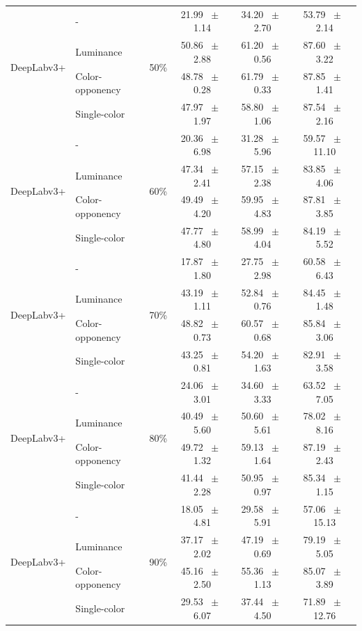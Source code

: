 \begin{table}[h]
\begin{tabular}{@{}l l c c c c@{}}
    \multirow{4}{*}{DeepLabv3+} & - & \multirow{4}{*}{50\%} & 21.99 ~$\pm$~ 1.14 & 34.20 ~$\pm$~ 2.70 & 53.79 ~$\pm$~ 2.14 \\
    & Luminance &  & 50.86 ~$\pm$~ 2.88 & 61.20 ~$\pm$~ 0.56 & 87.60 ~$\pm$~ 3.22 \\
    & Color-opponency &  & 48.78 ~$\pm$~ 0.28 & 61.79 ~$\pm$~ 0.33 & 87.85 ~$\pm$~ 1.41 \\
    & Single-color &  & 47.97 ~$\pm$~ 1.97 & 58.80 ~$\pm$~ 1.06 & 87.54 ~$\pm$~ 2.16 \\
    \midrule
    \multirow{4}{*}{DeepLabv3+} & - & \multirow{4}{*}{60\%} & 20.36 ~$\pm$~ 6.98 & 31.28 ~$\pm$~ 5.96 & 59.57 ~$\pm$~ 11.10 \\
    & Luminance &  & 47.34 ~$\pm$~ 2.41 & 57.15 ~$\pm$~ 2.38 & 83.85 ~$\pm$~ 4.06 \\
    & Color-opponency &  & 49.49 ~$\pm$~ 4.20 & 59.95 ~$\pm$~ 4.83 & 87.81 ~$\pm$~ 3.85 \\
    & Single-color &  & 47.77 ~$\pm$~ 4.80 & 58.99 ~$\pm$~ 4.04 & 84.19 ~$\pm$~ 5.52 \\
    \midrule
    \multirow{4}{*}{DeepLabv3+} & - & \multirow{4}{*}{70\%} & 17.87 ~$\pm$~ 1.80 & 27.75 ~$\pm$~ 2.98 & 60.58 ~$\pm$~ 6.43 \\
    & Luminance &  & 43.19 ~$\pm$~ 1.11 & 52.84 ~$\pm$~ 0.76 & 84.45 ~$\pm$~ 1.48 \\
    & Color-opponency &  & 48.82 ~$\pm$~ 0.73 & 60.57 ~$\pm$~ 0.68 & 85.84 ~$\pm$~ 3.06 \\
    & Single-color &  & 43.25 ~$\pm$~ 0.81 & 54.20 ~$\pm$~ 1.63 & 82.91 ~$\pm$~ 3.58 \\
    \midrule
    \multirow{4}{*}{DeepLabv3+} & - & \multirow{4}{*}{80\%} & 24.06 ~$\pm$~ 3.01 & 34.60 ~$\pm$~ 3.33 & 63.52 ~$\pm$~ 7.05 \\
    & Luminance &  & 40.49 ~$\pm$~ 5.60 & 50.60 ~$\pm$~ 5.61 & 78.02 ~$\pm$~ 8.16 \\
    & Color-opponency &  & 49.72 ~$\pm$~ 1.32 & 59.13 ~$\pm$~ 1.64 & 87.19 ~$\pm$~ 2.43 \\
    & Single-color &  & 41.44 ~$\pm$~ 2.28 & 50.95 ~$\pm$~ 0.97 & 85.34 ~$\pm$~ 1.15 \\
    \midrule
    \multirow{4}{*}{DeepLabv3+} & - & \multirow{4}{*}{90\%} & 18.05 ~$\pm$~ 4.81 & 29.58 ~$\pm$~ 5.91 & 57.06 ~$\pm$~ 15.13 \\
    & Luminance &  & 37.17 ~$\pm$~ 2.02 & 47.19 ~$\pm$~ 0.69 & 79.19 ~$\pm$~ 5.05 \\
    & Color-opponency &  & 45.16 ~$\pm$~ 2.50 & 55.36 ~$\pm$~ 1.13 & 85.07 ~$\pm$~ 3.89 \\
    & Single-color &  & 29.53 ~$\pm$~ 6.07 & 37.44 ~$\pm$~ 4.50 & 71.89 ~$\pm$~ 12.76 \\
    \midrule
    \bottomrule
  \end{tabular}
  \label{tab:deeplabv3plus_acdc_fog}
\end{table}